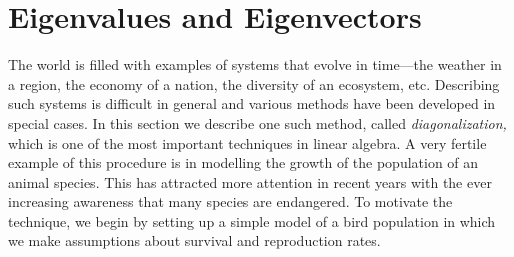 \section{Eigenvalues and Eigenvectors}
\label{sec:3_3}

The  world is filled with examples of systems that evolve in time---the 
weather in a region, the economy of a nation, the diversity of an 
ecosystem, etc. Describing such systems is difficult in general and 
various methods have been developed in special cases. In this section we
 describe one such method, called \textit{diagonalization,} which is one 
of the most important techniques in linear algebra. A very fertile 
example of this procedure is in modelling the growth of the population 
of an animal species. This has attracted more attention in recent years 
with the ever increasing awareness that many species are endangered. To 
motivate the technique, we begin by setting up a simple model of a bird 
population in which we make assumptions about survival and reproduction 
rates.

